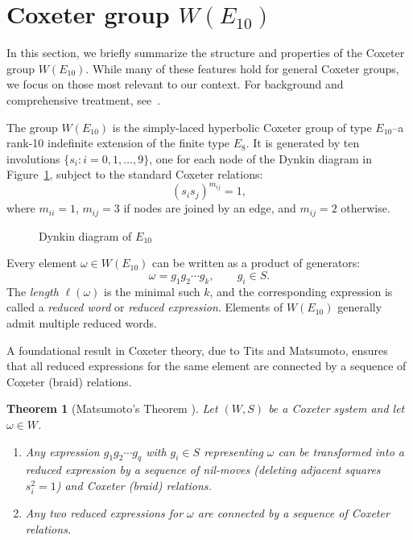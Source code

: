 \documentclass[11pt]{amsart}
\numberwithin{equation}{section}
\newtheorem{thm}{Theorem}[section]
\begin{document}
\section{Coxeter group $W(E_{10})$}\label{S:coxeter}

In this section, we briefly summarize the structure and properties of the Coxeter group $W(E_{10})$. While many of these features hold for general Coxeter groups, we focus on those most relevant to our context. For background and comprehensive treatment, see~\cite{BjornerBrenti,Humphreys1990}.

The group $W(E_{10})$ is the simply-laced hyperbolic Coxeter group of type $E_{10}$--a rank-10 indefinite extension of the finite type $E_8$. It is generated by ten involutions $\{s_i : i = 0, 1, \dots, 9\}$, one for each node of the Dynkin diagram in Figure~\ref{F:coxetergraph}, subject to the standard Coxeter relations:
\[
(s_i s_j)^{m_{ij}} = 1,
\]
where $m_{ii} = 1$, $m_{ij} = 3$ if nodes are joined by an edge, and $m_{ij} = 2$ otherwise.

\begin{figure}[h]
\centering
\def\svgwidth{3.1truein}

\caption{Dynkin diagram of $E_{10}$}
\label{F:coxetergraph}
\end{figure}

\medskip
Every element $\omega \in W(E_{10})$ can be written as a product of generators:
\[
\omega = g_1 g_2 \cdots g_k, \qquad g_i \in S.
\]
The \emph{length} $\ell(\omega)$ is the minimal such $k$, and the corresponding expression is called a \emph{reduced word} or \emph{reduced expression}. Elements of $W(E_{10})$ generally admit multiple reduced words.

A foundational result in Coxeter theory, due to Tits and Matsumoto, ensures that all reduced expressions for the same element are connected by a sequence of Coxeter (braid) relations.

\begin{thm}[Matsumoto's Theorem {\cite[Theorem~3.3.1]{BjornerBrenti}}]
Let $(W, S)$ be a Coxeter system and let $\omega \in W$.
\begin{enumerate}
\item Any expression $g_1 g_2 \cdots g_q$ with $g_i \in S$ representing $\omega$ can be transformed into a reduced expression by a sequence of \emph{nil-moves} (deleting adjacent squares $s_i^2 = 1$) and Coxeter (braid) relations.
\item Any two reduced expressions for $\omega$ are connected by a sequence of Coxeter relations.
\end{enumerate}
\end{thm}
\end{document}
